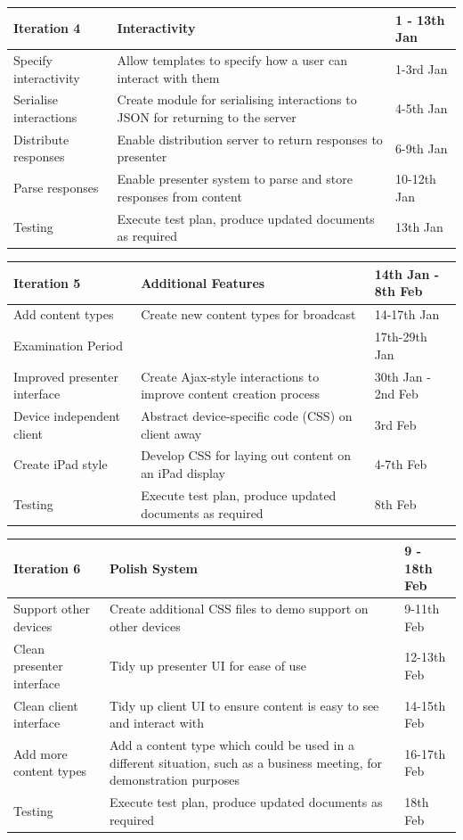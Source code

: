 \documentclass[a4papert,11pt,notitlepage]{ltxdoc}
\begin{document}
\begin{tabular}{p{5cm} p{7cm} p{4cm}}
\hline
Iteration 4 & Interactivity & 1 - 13th Jan \\
\hline
Specify interactivity & Allow templates to specify how a user can interact with them & 1-3rd Jan \\
Serialise interactions & Create module for serialising interactions to JSON for returning to the server & 4-5th Jan \\
Distribute responses & Enable distribution server to return responses to presenter & 6-9th Jan \\
Parse responses & Enable presenter system to parse and store responses from content & 10-12th Jan \\
Testing & Execute test plan, produce updated documents as required & 13th Jan \\
\end{tabular}

\begin{tabular}{p{5cm} p{7cm} p{4cm}}
\hline
Iteration 5 & Additional Features & 14th Jan - 8th Feb \\
\hline
Add content types & Create new content types for broadcast & 14-17th Jan \\
Examination Period & & 17th-29th Jan \\
Improved presenter interface & Create Ajax-style interactions to improve content creation process & 30th Jan - 2nd Feb \\
Device independent client & Abstract device-specific code (CSS) on client away & 3rd Feb \\
Create iPad style & Develop CSS for laying out content on an iPad display & 4-7th Feb \\
Testing & Execute test plan, produce updated documents as required & 8th Feb \\
\end{tabular}

\begin{tabular}{p{5cm} p{7cm} p{4cm}}
\hline
Iteration 6 & Polish System & 9 - 18th Feb \\
\hline
Support other devices & Create additional CSS files to demo support on other devices & 9-11th Feb \\
Clean presenter interface & Tidy up presenter UI for ease of use & 12-13th Feb \\
Clean client interface & Tidy up client UI to ensure content is easy to see and interact with & 14-15th Feb \\
Add more content types & Add a content type which could be used in a different situation, such as a business meeting, for demonstration purposes & 16-17th Feb \\
Testing & Execute test plan, produce updated documents as required & 18th Feb \\
\end{tabular}
\end{document}

